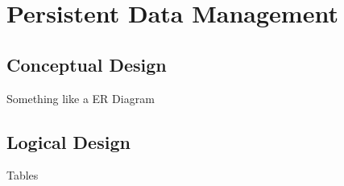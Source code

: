 \chapter{Persistent Data Management}

	\section{Conceptual Design}

	Something like a ER Diagram

	\section{Logical Design}

	Tables